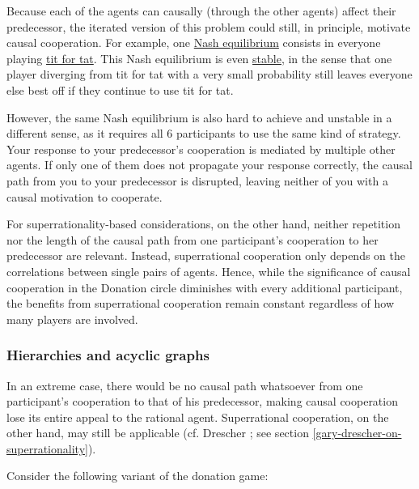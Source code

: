 Because each of the agents can causally (through the other agents)
affect their predecessor, the iterated version of this problem could
still, in principle, motivate causal cooperation. For example, one
\href{https://en.wikipedia.org/wiki/Nash_equilibrium}{Nash
equilibrium} consists in everyone playing
\href{https://en.wikipedia.org/wiki/Tit_for_tat}{tit for tat}.
This Nash equilibrium is even
\href{https://en.wikipedia.org/wiki/Nash_equilibrium\#Stability}{stable},
in the sense that one player diverging from tit for tat with a very
small probability still leaves everyone else best off if they continue
to use tit for tat.

However, the same Nash equilibrium is also hard to achieve and unstable
in a different sense, as it requires all 6 participants to use the same
kind of strategy. Your response to your predecessor's cooperation is
mediated by multiple other agents. If only one of them does not
propagate your response correctly, the causal path from you to your
predecessor is disrupted, leaving neither of you with a causal
motivation to cooperate.

For superrationality-based considerations, on the other hand, neither
repetition nor the length of the causal path from one participant's
cooperation to her predecessor are relevant. Instead, superrational
cooperation only depends on the correlations between single pairs of agents.
Hence, while the significance of causal cooperation in the Donation
circle diminishes with every additional participant, the benefits from
superrational cooperation remain constant regardless of how many players
are involved.

\hypertarget{hierarchies-and-acyclic-graphs}{\subsubsection{Hierarchies
and acyclic graphs}\label{hierarchies-and-acyclic-graphs}}

In an extreme case, there would be no causal path whatsoever from one
participant's cooperation to that of his predecessor, making causal
cooperation lose its entire appeal to the rational agent. Superrational
cooperation, on the other hand, may still be applicable (cf.
Drescher \citeyear{Drescher2006-ky}; see
section \ref{gary-drescher-on-superrationality}).

Consider the following variant of the donation game:

